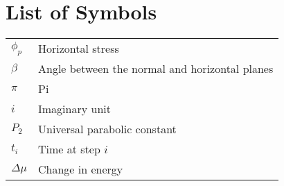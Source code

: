 \chapter*{List of Symbols} \label{symbols}

\begin{tabular}{@{}C{1in} L{4.5in}}
$\phi_p$ & Horizontal stress \\
$\beta$ & Angle between the normal and horizontal planes \\
$\pi$ & Pi \\
$i$ & Imaginary unit \\
$P_2$ & Universal parabolic constant \\
$t_i$ & Time at step $i$ \\
$\Delta\mu$ & Change in energy \\
\end{tabular}
